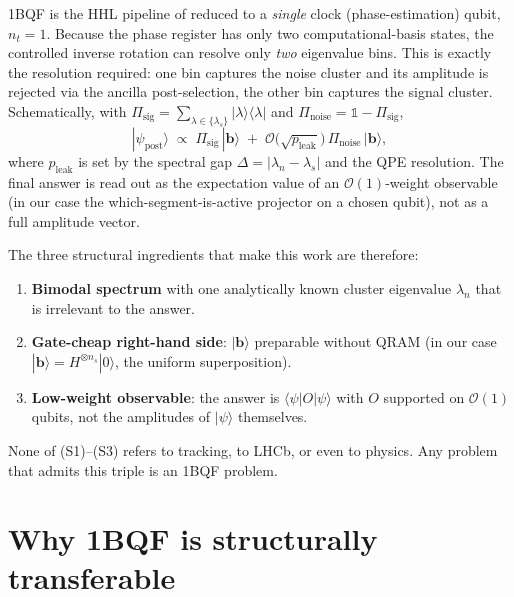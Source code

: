 \documentclass[11pt,a4paper]{article}
\newcommand{\OBQF}{\textsc{1BQF}}
\newcommand{\bra}[1]{\langle #1 |}
\newcommand{\ket}[1]{| #1 \rangle}
\begin{document}
\OBQF{} is the HHL pipeline of \cite{Harrow:2009} reduced to a
\emph{single} clock (phase-estimation) qubit, $n_t = 1$.  Because the
phase register has only two computational-basis states, the controlled
inverse rotation can resolve only \emph{two} eigenvalue bins.  This is
exactly the resolution required: one bin captures the noise cluster and
its amplitude is rejected via the ancilla post-selection, the other bin
captures the signal cluster.  Schematically, with
$\Pi_\mathrm{sig} = \sum_{\lambda \in \{\lambda_s\}} \ket{\lambda}\bra{\lambda}$
and $\Pi_\mathrm{noise} = \mathbb{1} - \Pi_\mathrm{sig}$,
\begin{equation}
  \ket{\psi_{\mathrm{post}}}
  \;\propto\;
  \Pi_\mathrm{sig}\,\ket{\mathbf{b}}
  \;+\;\mathcal{O}\!\bigl(\sqrt{p_\mathrm{leak}}\bigr)\,\Pi_\mathrm{noise}\,\ket{\mathbf{b}},
  \label{eq:filter}
\end{equation}
where $p_\mathrm{leak}$ is set by the spectral gap
$\Delta = |\lambda_n - \lambda_s|$ and the QPE resolution.  The
final answer is read out as the expectation value of an
$\mathcal{O}(1)$-weight observable (in our case the
which-segment-is-active projector on a chosen qubit), not as a full
amplitude vector.

The three structural ingredients that make this work are therefore:
\begin{enumerate}[label=(\textbf{S\arabic*}),leftmargin=2.4em,topsep=2pt,itemsep=2pt]
  \item \textbf{Bimodal spectrum} with one analytically known cluster
        eigenvalue $\lambda_n$ that is irrelevant to the answer.
  \item \textbf{Gate-cheap right-hand side}: $\ket{\mathbf{b}}$
        preparable without QRAM (in our case $\ket{\mathbf{b}}=H^{\otimes
        n_s}\ket{0}$, the uniform superposition).
  \item \textbf{Low-weight observable}: the answer is
        $\bra{\psi}O\ket{\psi}$ with $O$ supported on $\mathcal{O}(1)$
        qubits, not the amplitudes of $\ket{\psi}$ themselves.
\end{enumerate}
None of (S1)--(S3) refers to tracking, to LHCb, or even to physics. Any
problem that admits this triple is an \OBQF{} problem.

\section{Why \OBQF{} is structurally transferable}
\label{sec:why-transferable}
\end{document}

